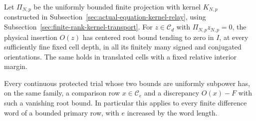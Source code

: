 \begin{lemma}
\label{lem:fullmesh-uniform-sweep}
Let $\Pi_{N,p}$ be the uniformly bounded finite projection with kernel
$K_{N,p}$ constructed in
Subsection~\ref{sec:actual-equation-kernel-relay}, using
Subsection~\ref{sec:finite-rank-kernel-transport}.
For $z\in\mathscr C_d$ with $\Pi_{N,p}z_{N,p}=0$, the physical insertion
$O(z)$ has centered root bound tending to zero in $I$, at every
sufficiently fine fixed cell depth, in all its finitely many signed and
conjugated orientations. The same holds in translated cells with a fixed
relative interior margin.

Every continuous protected trial whose two bounds are uniformly
subpower has, on the same family, a comparison row $x\in\mathscr C_e$
and a discrepancy $O(x)-F$ with such a vanishing root bound. In
particular this applies to every finite difference word of a bounded
primary row, with $e$ increased by the word length.
\end{lemma}
